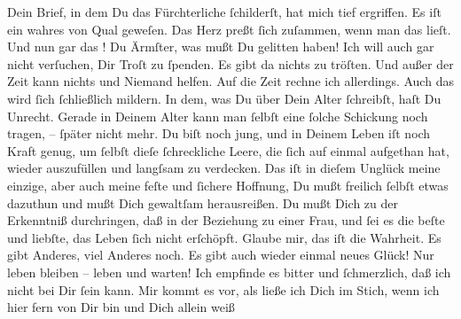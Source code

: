 \begin{ledgroupsized}[t]{13cm}
           Dein Brief, in dem Du das Fürchterliche ſchilderſt, hat mich tief ergriffen. Es iſt
               ein wahres \label{K_L02871-3v}\label{K_L02871-3h} von
               Qual geweſen. Das Herz preßt ſich zuſammen, wenn man das lieſt. Und nun gar das
                  \label{K_L02871-4v}\label{K_L02871-4h}! Du
               Ärmſter, was mußt Du gelitten haben! Ich will auch gar nicht verſuchen, Dir Troſt zu
               ſpenden. Es gibt  da nichts zu tröſten. Und außer der Zeit kann nichts und Niemand helfen. Auf
               die Zeit rechne ich allerdings. Auch das wird ſich ſchließlich mildern.  In dem, was Du über {\pb}Dein Alter ſchreibſt,
               haſt Du Unrecht. Gerade in Deinem Alter kann man ſelbſt eine ſolche Schickung noch
               tragen, – ſpäter nicht mehr. Du biſt noch jung, und in Deinem Leben iſt noch Kraft
               genug, um ſelbſt dieſe ſchreckliche Leere, die ſich auf einmal aufgethan hat, wieder
               auszufüllen und \strikeout{\textcolor{gray}{zu}\textcolor{gray}{×}} langſsam \introOben{}zu\introOben{} verdecken. Das iſt \strikeout{\textcolor{gray}{×}} in dieſem Unglück meine einzige, aber auch meine feſte und ſichere Hoffnung,
               Du mußt freilich ſelbſt etwas dazuthun und mußt Dich gewaltſam herausreißen. Du mußt
               Dich zu der Erkenntniß durchringen, daß in der Beziehung zu einer Frau, und ſei es
               die beſte und liebſte, das Leben ſich nicht erſchöpft. Glaube mir, das iſt die
               Wahrheit. Es gibt Anderes, viel Anderes noch. Es gibt auch wieder einmal neues Glück!
               Nur leben bleiben – leben und warten!\pend
           \pstart
           Ich empfinde es bitter und ſchmerzlich, daß ich nicht bei Dir ſein kann. Mir kommt es
               vor, als ließe ich Dich im Stich, wenn ich hier fern von Dir bin und Dich allein weiß

\end{ledgroupsized}

